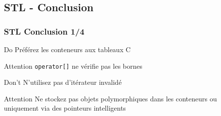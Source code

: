 \documentclass[C++.tex]{subfiles}
\begin{document}
\subsection*{STL - Conclusion}
\begin{frame}
	\frametitle{STL Conclusion \titlehfill{}1/4}
	\begin{exampleblock}{Do}
		Préférez les conteneurs aux tableaux C
	\end{exampleblock}

	\begin{alertblock}{Attention}
		\lstinline|operator[]| ne vérifie pas les bornes

	\end{alertblock}


	\begin{alertblock}{Don't}
		N'utilisez pas d'itérateur invalidé

	\end{alertblock}

	\begin{alertblock}{Attention}
		Ne stockez pas objets polymorphiques dans les conteneurs ou uniquement via des pointeurs intelligents
	\end{alertblock}
\end{frame}
\end{document}

